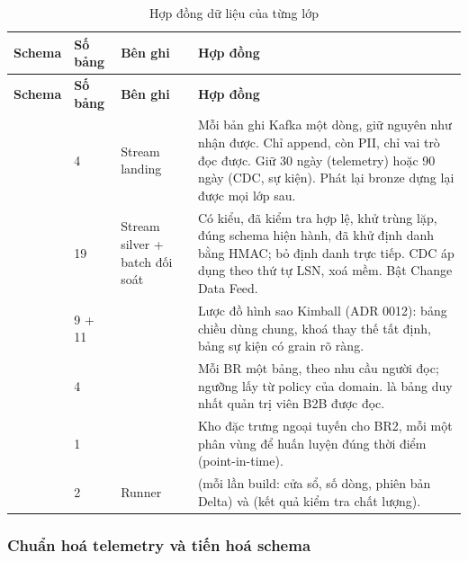 {\small
\begin{longtable}{@{}L{1.7cm}L{1.4cm}L{3.2cm}L{8.2cm}@{}}
\caption{Hợp đồng dữ liệu của từng lớp}\label{tab:layers-contract}\\
\toprule
\textbf{Schema} & \textbf{Số bảng} & \textbf{Bên ghi} & \textbf{Hợp đồng} \\
\midrule
\endfirsthead
\toprule
\textbf{Schema} & \textbf{Số bảng} & \textbf{Bên ghi} & \textbf{Hợp đồng} \\
\midrule
\endhead
{} & 4 & Stream landing & Mỗi bản ghi Kafka một dòng, giữ nguyên như nhận được. Chỉ append, còn PII, chỉ vai trò  đọc được. Giữ 30 ngày (telemetry) hoặc 90 ngày (CDC, sự kiện). Phát lại bronze dựng lại được mọi lớp sau. \\
 & 19 & Stream silver + batch đối soát & Có kiểu, đã kiểm tra hợp lệ, khử trùng lặp, đúng schema hiện hành, đã khử định danh bằng HMAC; bỏ định danh trực tiếp. CDC áp dụng theo thứ tự LSN, xoá mềm. Bật Change Data Feed. \\
 & 9 + 11 &  & Lược đồ hình sao Kimball (ADR 0012): bảng chiều dùng chung, khoá thay thế tất định, bảng sự kiện có grain rõ ràng. \\
 & 4 &  & Mỗi BR một bảng, theo nhu cầu người đọc; ngưỡng lấy từ policy của domain.  là bảng duy nhất quản trị viên B2B được đọc. \\
 & 1 &  & Kho đặc trưng ngoại tuyến cho BR2, mỗi  một phân vùng để huấn luyện đúng thời điểm (point-in-time). \\
 & 2 & Runner &  (mỗi lần build: cửa sổ, số dòng, phiên bản Delta) và  (kết quả kiểm tra chất lượng). \\
\bottomrule
\end{longtable}}

\subsubsection{Chuẩn hoá telemetry và tiến hoá schema}


